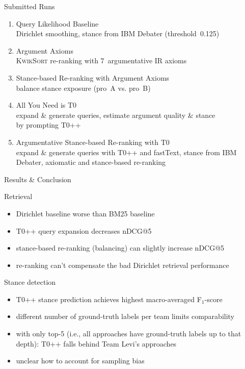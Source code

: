\documentclass[english]{mlutalk}
\begin{document}
\begin{frame}{Submitted Runs}
  \begin{enumerate}
    \setlength{\itemsep}{2.5ex}
    \item Query Likelihood Baseline \\
    {\footnotesize Dirichlet smoothing, stance from IBM Debater (threshold~0.125)}
    \item Argument Axioms \\
    {\footnotesize \textsc{KwikSort} re-ranking with 7~argumentative IR axioms}
    \item Stance-based Re-ranking with Argument Axioms \\
    {\footnotesize balance stance exposure (pro~A vs. pro~B)}
    \item All You Need is T0 \\
    {\footnotesize expand \& generate queries, estimate argument quality \& stance \\ by prompting T0++}
    \item Argumentative Stance-based Re-ranking with T0 \\
    {\footnotesize expand \& generate queries with T0++ and fastText, stance from IBM Debater, axiomatic and stance-based re-ranking}
  \end{enumerate}
\end{frame}

\begin{frame}{Results \& Conclusion}
  \begin{block}{Retrieval}
    \begin{itemize}
      \item Dirichlet baseline worse than BM25 baseline~\cite{BondarenkoFKSGBPBSWPH2022}
      \item T0++ query expansion decreases nDCG@5
      \item stance-based re-ranking (balancing) can slightly increase nDCG@5
      \item re-ranking can't compensate the bad Dirichlet retrieval performance
    \end{itemize}
  \end{block}
  \begin{block}{Stance detection}
    \begin{itemize}
      \item T0++ stance prediction achieves highest macro-averaged F$_1$-score
      \item different number of ground-truth labels per team limits comparability
      \item with only top-5 (i.e., all approaches have ground-truth labels up to that depth): T0++ falls behind Team Levi's approaches
      \item unclear how to account for sampling bias
    \end{itemize}
  \end{block}
\end{frame}
\end{document}
